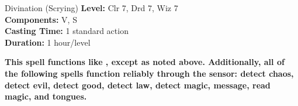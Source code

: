 {Divination (Scrying)}
{
	\textbf{Level:}
	Clr 7, Drd 7, Wiz 7\\
	\textbf{Components:}
	V, S\\
	\textbf{Casting Time:}
	1 standard action\\
	\textbf{Duration:}
	1 hour/level\\
}
{
	\textbf{	This spell functions like , except as noted above. Additionally, all of the following spells function reliably through the sensor: detect chaos, detect evil, detect good, detect law, detect magic, message, read magic, and tongues.}

}
